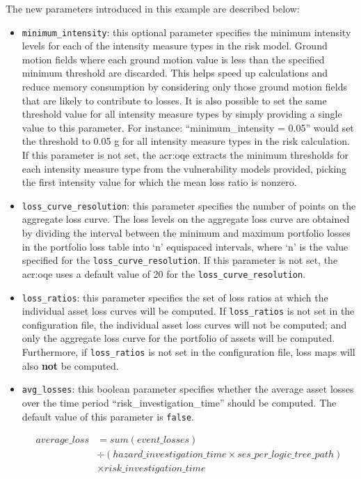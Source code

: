 The new parameters introduced in this example are described below:

\begin{itemize}

  \item \Verb+minimum_intensity+: this optional parameter specifies the minimum
    intensity levels for each of the intensity measure types in the risk model.
    Ground motion fields where each ground motion value is less than the 
    specified minimum threshold are discarded. This helps speed up calculations
    and reduce memory consumption by considering only those ground motion fields
    that are likely to contribute to losses. It is also possible to set the same
    threshold value for all intensity measure types by simply providing a single
    value to this parameter. For instance: ``minimum\_intensity = 0.05'' would
    set the threshold to 0.05 g for all intensity measure types in the risk 
    calculation.
    If this parameter is not set, the \glsdesc{acr:oqe} extracts the minimum
    thresholds for each intensity measure type from the vulnerability
    models provided, picking the first intensity value for which the mean loss
    ratio is nonzero.

  \item \Verb+loss_curve_resolution+: this parameter specifies the number of
    points on the aggregate loss curve. The loss levels on the aggregate loss
    curve are obtained by dividing the interval between the minimum and maximum
    portfolio losses in the portfolio loss table into `n' equispaced intervals,
    where `n' is the value specified for the \Verb+loss_curve_resolution+.
    If this parameter is not set, the \glsdesc{acr:oqe} uses a default value of
    20 for the \Verb+loss_curve_resolution+.

  \item \Verb+loss_ratios+: this parameter specifies the set of loss ratios at
    which the individual asset loss curves will be computed. If
    \Verb+loss_ratios+ is not set in the configuration file, the individual 
    asset loss curves will not be computed; and only the aggregate loss curve
    for the portfolio of assets will be computed. Furthermore, if
    \Verb+loss_ratios+ is not set in the configuration file, loss maps will
    also \textbf{not} be computed.

  \item \Verb+avg_losses+: this boolean parameter specifies whether the average
    asset losses over the time period ``risk\_investigation\_time'' should be
    computed. The default value of this parameter is \Verb+false+.

    \begin{equation*}
    \begin{split}
    average\_loss & = sum(event\_losses) \\
                 & \div (hazard\_investigation\_time \times ses\_per\_logic\_tree\_path) \\
                 & \times risk\_investigation\_time
    \end{split}
    \end{equation*}

\end{itemize}

